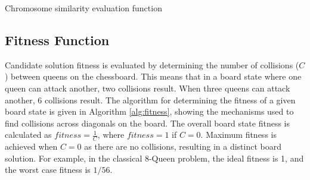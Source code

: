 \documentclass[conference]{IEEEtran}
\begin{document}
\begin{algorithm}
  \SetAlgoLined
  \DontPrintSemicolon
  
\caption{Chromosome similarity evaluation function}
\label{alg:similarity}
\end{algorithm}

\subsection{Fitness Function}
Candidate solution fitness is evaluated by determining the number of collisions ($C$) between queens on the chessboard. This means that in a board state where one queen can attack another, two collisions result. When three queens can attack another, 6 collisions result. The algorithm for determining the fitness of a given board state is given in Algorithm \ref{alg:fitness}, showing the mechanisms used to find collisions across diagonals on the board. The overall board state fitness is calculated as $fitness = \frac{1}{C}$, where $fitness = 1$ if $C = 0$. Maximum fitness is achieved when $C = 0$ as there are no collisions, resulting in a distinct board solution. For example, in the classical 8-Queen problem, the ideal fitness is 1, and the worst case fitness is $1/56$.
 
\end{document}
